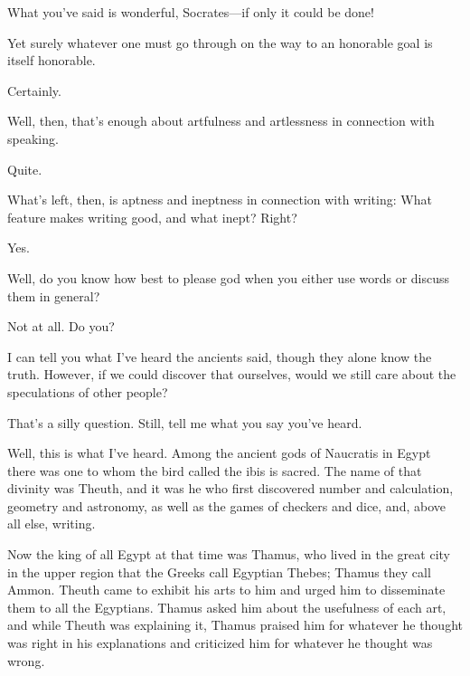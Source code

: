\sayphaedrus What you've said is wonderful, Socrates---if only it could be
done!

\saysocrates Yet surely whatever one must go through on the way to
an honorable goal is itself honorable.

\sayphaedrus Certainly.

\saysocrates Well, then, that's enough about artfulness and artlessness in
connection with speaking.

\sayphaedrus Quite.

\saysocrates What's left, then, is aptness and ineptness in connection with
writing: What feature makes writing good, and what inept? Right?

\sayphaedrus Yes.

\saysocrates Well, do you know how best to please god when you either use
words or discuss them in general?

\sayphaedrus Not at all. Do you?

\saysocrates I can tell you what I've heard the ancients said, though they 
alone know the truth. However, if we could discover that
ourselves, would we still care about the speculations of other people?

\sayphaedrus That's a silly question. Still, tell me what you say you've
heard.

\saysocrates Well, this is what I've heard. Among the ancient gods of
Naucratis in Egypt
there was one to whom the bird called the ibis is sacred. The name of
that divinity was
Theuth, and it was he
who first discovered number and calculation, geometry and astronomy, as
well as the games of checkers and dice, and, above all else,
writing.

Now the king of all Egypt at that time was
Thamus, who lived in
the great city in the upper region that the Greeks call Egyptian Thebes;
Thamus they call
Ammon. Theuth came to
exhibit his arts to him and urged him to disseminate them to all the
Egyptians. Thamus asked him about the usefulness of each art, and while
Theuth was explaining it, Thamus praised him for whatever he
thought was right in his explanations and criticized him for whatever he
thought was wrong.

